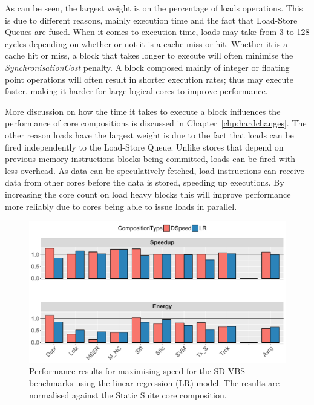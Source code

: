 As can be seen, the largest weight is on the percentage of loads operations.
This is due to different reasons, mainly execution time and the fact that Load-Store Queues are fused.
When it comes to execution time, loads may take from 3 to 128 cycles depending on whether or not it is a cache miss or hit.
Whether it is a cache hit or miss, a block that takes longer to execute will often minimise the \textit{SynchronisationCost} penalty.
A block composed mainly of integer or floating point operations will often result in shorter execution rates; thus may execute faster, making it harder for large logical cores to improve performance.

More discussion on how the time it takes to execute a block influences the performance of core compositions is discussed in Chapter~\ref{chp:hardchanges}.
The other reason loads have the largest weight is due to the fact that loads can be fired independently to the Load-Store Queue.
Unlike stores that depend on previous memory instructions blocks being committed, loads can be fired with less overhead.
As data can be speculatively fetched, load instructions can receive data from other cores before the data is stored, speeding up executions.
By increasing the core count on load heavy blocks this will improve performance more reliably due to cores being able to issue loads in parallel.

\begin{figure}[t]
    \centering
	\includegraphics[width=1\textwidth]{cases-paper/graphics/results/lr_speed3.pdf}
    \caption{Performance results for maximising speed for the SD-VBS benchmarks using the linear regression (LR) model. The results are normalised against the Static Suite core composition.}%
    \label{fig:speedlr}
	\vspace{1em}
\end{figure}

